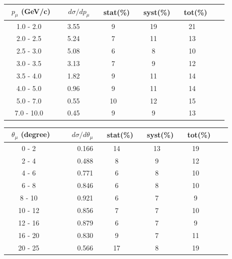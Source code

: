 \documentclass[aps, prd, reprint,showpacs,  preprintnumbers,amsmath,amssymb,superscriptaddress, nofootinbib]{revtex4-1}
\makeatletter
\renewenvironment{table}
  {\def\@captype{table}}
  {}
\makeatother
\begin{document}

\begin{table}
\centering
\begin{tabular}{ccccccc}
\hline
~$p_{\mu}$ (GeV/c) &~~ $d\sigma/dp_{\mu}$ &~ stat(\%) &~ syst(\%) &~ tot(\%)  \\
\hline
     1.0 - 2.0 &   3.55 &    9 &   19 &   21 \\
     2.0 - 2.5 &   5.24 &    7 &   11 &   13 \\
     2.5 - 3.0 &   5.08 &    6 &    8 &   10 \\
     3.0 - 3.5 &   3.13 &    7 &    9 &   12 \\
     3.5 - 4.0 &   1.82 &    9 &   11 &   14 \\
     4.0 - 5.0 &   0.96 &    9 &   11 &   14 \\
     5.0 - 7.0 &   0.55 &   10 &   12 &   15 \\
    7.0 - 10.0 &   0.45 &    9 &    9 &   13 \\
\hline\hline
\end{tabular}
\caption{ Flux-averaged differential cross section in muon momentum 
$p_\mu$, $d\sigma/dp_{\mu}(10^{-40}\text{cm}^2/\text{nucleon}/(\text{GeV/c}))$, 
for $\pi^0$+nucleon(s) production with statistical (stat), systematic (syst), and total (tot) uncertainties.}
\label{tb:muon-momentum}
\end{table}



\begin{table}
\centering
\begin{tabular}{crccccc}
\hline
~$\theta_{\mu}$ (degree) &~~~ $d\sigma/d\theta_{\mu}$ &~ stat(\%) &~ syst(\%) &~ tot(\%)  \\
\hline
        0 -  2 &  0.166 &   14 &   13 &   19 \\
        2 -  4 &  0.488 &    8 &    9 &   12 \\
        4 -  6 &  0.771 &    6 &    8 &   10 \\
        6 -  8 &  0.846 &    6 &    8 &   10 \\
        8 - 10 &  0.921 &    6 &    7 &    9 \\
       10 - 12 &  0.856 &    7 &    7 &   10 \\
       12 - 16 &  0.879 &    6 &    7 &    9 \\
       16 - 20 &  0.830 &    9 &    7 &   11 \\
       20 - 25 &  0.566 &   17 &    8 &   19 \\
\hline\hline
\end{tabular}
\caption{ Flux-averaged differential cross section in muon angle 
$\theta_\mu$, $d\sigma/d\theta_{\mu}(10^{-40}\text{cm}^2/\text{nucleon}/\text{degree})$, 
for $\pi^0$+nucleon(s) production with statistical (stat), systematic (syst), and total (tot) uncertainties.}
\label{tb:muon-angle}
\end{table}
\end{document}
